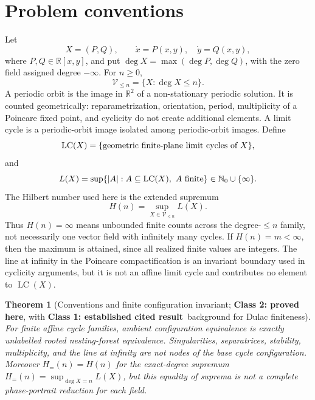 \documentclass[11pt]{article}
\newtheorem{theorem}{Theorem}
\newcommand{\R}{\mathbb R}
\newcommand{\NN}{\mathbb N}
\newcommand{\classone}{\textbf{Class 1: established cited result}}
\newcommand{\classtwo}{\textbf{Class 2: proved here}}
\begin{document}
\section{Problem conventions}
Let
\[
  X=(P,Q),\qquad \dot x=P(x,y),\quad \dot y=Q(x,y),
\]
where \(P,Q\in\R[x,y]\), and put \(\deg X=\max(\deg P,\deg Q)\), with the zero field assigned degree \(-\infty\).  For \(n\ge0\),
\[
  \mathcal V_{\le n}=\{X:\deg X\le n\}.
\]
A periodic orbit is the image in \(\R^2\) of a non-stationary periodic solution.  It is counted geometrically: reparametrization, orientation, period, multiplicity of a Poincare fixed point, and cyclicity do not create additional elements.  A limit cycle is a periodic-orbit image isolated among periodic-orbit images.  Define
\[
  \operatorname{LC}(X)=\{\hbox{geometric finite-plane limit cycles of }X\},
\]
and
\[
  L(X)=\sup\{|A|:A\subseteq\operatorname{LC}(X),\ A\hbox{ finite}\}\in\NN_0\cup\{\infty\}.
\]
The Hilbert number used here is the extended supremum
\[
  H(n)=\sup_{X\in\mathcal V_{\le n}}L(X).
\]
Thus \(H(n)=\infty\) means unbounded finite counts across the degree-\(\le n\) family, not necessarily one vector field with infinitely many cycles.  If \(H(n)=m<\infty\), then the maximum is attained, since all realized finite values are integers.  The line at infinity in the Poincare compactification is an invariant boundary used in cyclicity arguments, but it is not an affine limit cycle and contributes no element to \(\operatorname{LC}(X)\).

\begin{theorem}[Conventions and finite configuration invariant; \classtwo, with \classone\ background for Dulac finiteness]\label{thm:conventions}
For finite affine cycle families, ambient configuration equivalence is exactly unlabelled rooted nesting-forest equivalence.  Singularities, separatrices, stability, multiplicity, and the line at infinity are not nodes of the base cycle configuration.  Moreover \(H_{=}(n)=H(n)\) for the exact-degree supremum \(H_{=}(n)=\sup_{\deg X=n}L(X)\), but this equality of suprema is not a complete phase-portrait reduction for each field.
\end{theorem}
\end{document}
